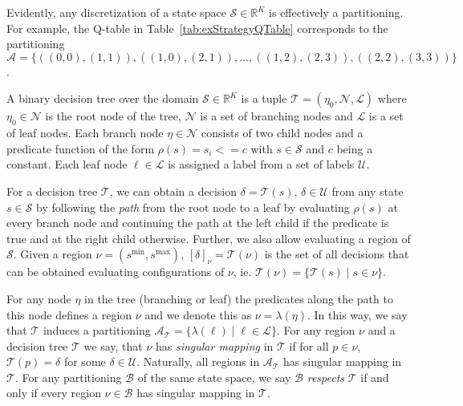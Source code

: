 Evidently, any discretization of a state space $\mathcal{S} \in \mathbb{R}^K$ is
effectively a partitioning. For example, the Q-table in
Table~\ref{tab:exStrategyQTable} corresponds to the partitioning $\mathcal{A} =
\{ ((0,0),(1,1)), ((1,0),(2,1)),\ldots, ((1,2),(2,3)), ((2,2),(3,3)) \}$.

\begin{definition}%
\label{def:decisionTree}
    A binary decision tree over the domain $\mathcal{S} \in \mathbb{R}^K$ is a
    tuple $\mathcal{T} = (\eta_{0}, \mathcal{N}, \mathcal{L})$ where $\eta_{0}
    \in \mathcal{N}$ is the root node of the tree, $\mathcal{N}$ is a set of
    branching nodes and $\mathcal{L}$ is a set of leaf nodes. Each branch node
    $\eta \in \mathcal{N}$ consists of two child nodes and a predicate function 
    of the form $\rho(s) = s_{i} <= c$ with $s \in \mathcal{S}$ and $c$ being a
    constant. Each leaf node $\ell \in \mathcal{L}$ is assigned a label from a
    set of labels $\mathcal{U}$.
\end{definition}

For a decision tree $\mathcal{T}$, we can obtain a decision $\delta =
\mathcal{T}(s)$, $\delta \in \mathcal{U}$ from any state $s \in \mathcal{S}$ by
following the \textit{path} from the root node to a leaf by evaluating $\rho(s)$
at every branch node and continuing the path at the left child if the predicate
is true and at the right child otherwise. Further, we also allow evaluating a
region of $\mathcal{S}$.  Given a region $\nu = (s^{\min}, s^{\max})$,
$[\delta]_{\nu} = \mathcal{T}(\nu)$ is the set of all decisions that can be
obtained evaluating configurations of $\nu$, ie. $\mathcal{T}(\nu) = \{
\mathcal{T}(s) \mid s \in \nu \}$.

For any node $\eta$ in the tree (branching or leaf) the predicates along the
path to this node defines a region $\nu$ and we denote this as $\nu =
\lambda(\eta)$. In this way, we say that $\mathcal{T}$ induces a partitioning
$\mathcal{A}_{\mathcal{T}} = \{ \lambda(\ell) \mid \ell \in \mathcal{L} \}$. For
any region $\nu$ and a decision tree $\mathcal{T}$ we say, that $\nu$ has
\textit{singular mapping} in $\mathcal{T}$ if for all $p \in \nu$,
$\mathcal{T}(p) = \delta$ for some $\delta \in \mathcal{U}$. Naturally, all
regions in $\mathcal{A}_{\mathcal{T}}$ has singular mapping in $\mathcal{T}$.
For any partitioning $\mathcal{B}$ of the same state space, we say $\mathcal{B}$
\textit{respects} $\mathcal{T}$ if and only if every region $\nu \in
\mathcal{B}$ has singular mapping in $\mathcal{T}$.
